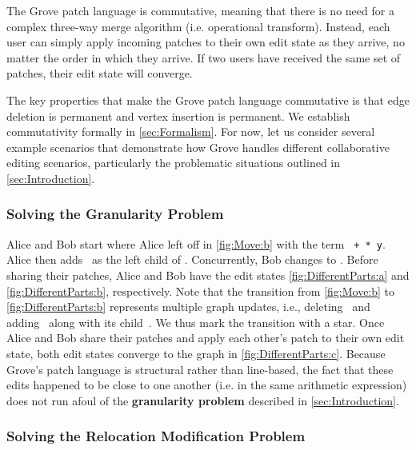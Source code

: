 \label{sub:Commutativity:informal}
The Grove patch language is commutative, meaning that there is no need for a 
complex three-way merge algorithm (i.e. operational transform). Instead, each 
user can simply apply incoming patches to their own edit state as they arrive, no matter the order in 
which they arrive. If two users have received the same set of patches, their edit state will converge.

The key properties that make the Grove patch language commutative is that 
edge deletion is permanent and vertex insertion is permanent.
We establish commutativity formally in \autoref{sec:Formalism}.
For now, let us consider several example scenarios that demonstrate 
how Grove handles different collaborative editing scenarios, particularly 
the problematic situations outlined in \autoref{sec:Introduction}. 

\subsubsection{Solving the Granularity Problem}%
\label{sub:Editing Different Parts of the Code}

Alice and Bob start where Alice left off in \autoref{fig:Move:b} 
with the term \texttt{\hole{} + \hole{} * y}.
Alice then adds~\vDifferentPartsAlice{} as the left child of \vSimpleTimes{}.
Concurrently, Bob changes \vSimpleY{} to \vDifferentPartsBob{}.
Before sharing their patches,
Alice and Bob have the edit states \autoref{fig:DifferentParts:a} and \autoref{fig:DifferentParts:b}, respectively.
Note that the transition from \autoref{fig:Move:b} to \autoref{fig:DifferentParts:b}
represents multiple graph updates,
i.e., deleting~\eSimpleY{} and adding~\eDifferentPartsBob{} along with its child~\vDifferentPartsBob{}.
We thus mark the transition with a star.
Once Alice and Bob share their patches and apply each other's patch to their own edit state,
both edit states converge to the graph in \autoref{fig:DifferentParts:c}. 
Because Grove's patch language is structural rather than line-based, the fact that these edits happened to be close to one another (i.e. in the same arithmetic expression) does not run afoul of the \textbf{granularity problem} described in \autoref{sec:Introduction}.


\subsubsection{Solving the Relocation Modification Problem}%
\label{sub:Editing Nested Parts of the Code}

